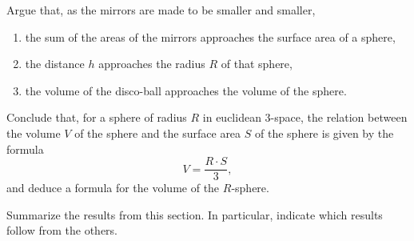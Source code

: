 \documentclass[hints,handout,noauthor,nooutcomes,12pt]{ximera}
\begin{document}
\begin{problem}
Argue that, as the mirrors are made to be smaller and smaller,
\begin{enumerate}
\item the sum of the areas of the mirrors approaches the surface area of a sphere,
\item the distance $h$ approaches the radius $R$ of that sphere,
\item the volume of the disco-ball approaches the volume of the sphere.
\end{enumerate}
Conclude that, for a sphere of radius $R$ in euclidean $3$-space, the relation
between the volume $V$ of the sphere and the surface area $S$ of the sphere is
given by the formula%
\[
V=\frac{R\cdot S}{3},
\]
and deduce a formula for the volume of the $R$-sphere.

\end{problem}





\begin{problem}
Summarize the results from this section. In particular, indicate which
results follow from the others.
\begin{freeResponse}
\end{freeResponse}
\end{problem}
\end{document}
